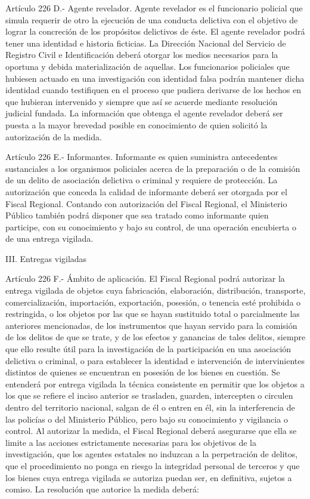     Artículo 226 D.- Agente revelador. Agente revelador es el funcionario policial que simula requerir de otro la ejecución de una conducta delictiva con el objetivo de lograr la concreción de los propósitos delictivos de éste.
    El agente revelador podrá tener una identidad e historia ficticias. La Dirección Nacional del Servicio de Registro Civil e Identificación deberá otorgar los medios necesarios para la oportuna y debida materialización de aquellas. Los funcionarios policiales que hubiesen actuado en una investigación con identidad falsa podrán mantener dicha identidad cuando testifiquen en el proceso que pudiera derivarse de los hechos en que hubieran intervenido y siempre que así se acuerde mediante resolución judicial fundada.
    La información que obtenga el agente revelador deberá ser puesta a la mayor brevedad posible en conocimiento de quien solicitó la autorización de la medida.

    Artículo 226 E.- Informantes. Informante es quien suministra antecedentes sustanciales a los organismos policiales acerca de la preparación o de la comisión de un delito de asociación delictiva o criminal y requiere de protección.
    La autorización que conceda la calidad de informante deberá ser otorgada por el Fiscal Regional.
    Contando con autorización del Fiscal Regional, el Ministerio Público también podrá disponer que sea tratado como informante quien participe, con su conocimiento y bajo su control, de una operación encubierta o de una entrega vigilada.

    III. Entregas vigiladas



    Artículo 226 F.- Ámbito de aplicación. El Fiscal Regional podrá autorizar la entrega vigilada de objetos cuya fabricación, elaboración, distribución, transporte, comercialización, importación, exportación, posesión, o tenencia esté prohibida o restringida, o los objetos por las que se hayan sustituido total o parcialmente las anteriores mencionadas, de los instrumentos que hayan servido para la comisión de los delitos de que se trate, y de los efectos y ganancias de tales delitos, siempre que ello resulte útil para la investigación de la participación en una asociación delictiva o criminal, o para establecer la identidad e intervención de intervinientes distintos de quienes se encuentran en posesión de los bienes en cuestión.
    Se entenderá por entrega vigilada la técnica consistente en permitir que los objetos a los que se refiere el inciso anterior se trasladen, guarden, intercepten o circulen dentro del territorio nacional, salgan de él o entren en él, sin la interferencia de las policías o del Ministerio Público, pero bajo su conocimiento y vigilancia o control.
    Al autorizar la medida, el Fiscal Regional deberá asegurarse que ella se limite a las acciones estrictamente necesarias para los objetivos de la investigación, que los agentes estatales no induzcan a la perpetración de delitos, que el procedimiento no ponga en riesgo la integridad personal de terceros y que los bienes cuya entrega vigilada se autoriza puedan ser, en definitiva, sujetos a comiso.
    La resolución que autorice la medida deberá:

